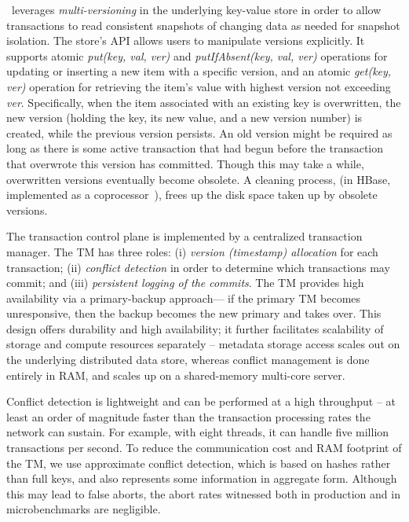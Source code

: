 \sys\ leverages  \emph{multi-versioning}  in the underlying key-value store in order to allow transactions to read consistent snapshots of changing data as needed for snapshot isolation. The store's API allows users to manipulate versions explicitly. It supports atomic {\em put(key, val, ver)}  and  {\em putIfAbsent(key, val, ver)} operations for updating or inserting a new  item with a specific version, and an atomic {\em get(key, ver)} operation for retrieving the item's value with highest version not exceeding \emph{ver}.
Specifically, when the item associated with an existing key is overwritten, the new version (holding the key, its new value, and a new version number)  is created, while the previous version persists. 
An old version might be required as long as there is some active transaction that had begun before the transaction that overwrote this version has committed. Though this may take a while, overwritten versions eventually become obsolete. 
A cleaning process, (in HBase, implemented as a coprocessor~\cite{hbase-coproc}),
frees up the disk space taken up by obsolete versions. 


The transaction control plane is implemented by a centralized transaction manager.
The TM has three roles: (i) \emph{version (timestamp) allocation} for each transaction; (ii) \emph{conflict detection} in order to determine which transactions may commit; 
and (iii) \emph{persistent logging of the commits}.
The TM provides high availability via a primary-backup approach--- if the primary TM becomes unresponsive, then the backup becomes the new primary and takes over. 
This design offers durability and high availability; it further facilitates scalability of storage and compute resources separately -- 
metadata storage access scales out on the underlying distributed data store, whereas 
conflict management is done entirely in RAM, and scales up on a shared-memory multi-core server. 

Conflict detection
is lightweight and can be performed at a high throughput -- at least an order of magnitude faster than the transaction 
processing rates the network can sustain.
For example, with 
eight threads, it can handle 
five million transactions per second.
To reduce the communication cost and RAM footprint of the TM, we use approximate conflict detection, which is 
based on hashes rather than  full keys, and also represents some information in aggregate form. 
Although this may lead to false aborts, the abort rates witnessed both in production and 
in microbenchmarks are negligible.

